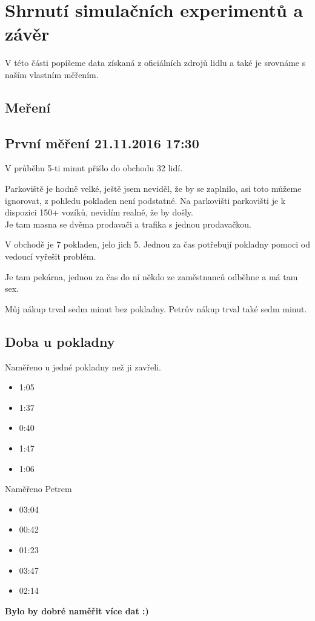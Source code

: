 \documentclass[12pt,a4paper,titlepage]{article}
\begin{document}
\section{Shrnutí simulačních experimentů a závěr}

V této části popíšeme data získaná z oficiálních zdrojů lidlu a také je srovnáme s naším vlastním měřením.
\subsection{Meření}
\subsection{První měření 21.11.2016 17:30}
V průběhu 5-ti minut přišlo do obchodu 32 lidí.

Parkoviště je hodně velké, ještě jsem neviděl, že by se zaplnilo, asi toto můžeme ignorovat, z pohledu pokladen není podstatné.
Na parkovišti parkovišti je k dispozici 150+ vozíků, nevidím realně, že by došly.
\\
Je tam masna se dvěma prodavači a trafika s jednou prodavačkou.

V obchodě je 7 pokladen, jelo jich 5. Jednou za čas potřebují pokladny pomoci od vedoucí vyřešit problém.

Je tam pekárna, jednou za čas do ní někdo ze zaměstnanců odběhne a má tam sex.

Můj nákup trval sedm minut bez pokladny. Petrův nákup trval také sedm minut.

\subsection{Doba u pokladny}
Naměřeno u jedné pokladny než ji zavřeli.
\begin{itemize}
\item 1:05
\item 1:37
\item 0:40
\item 1:47
\item 1:06
\end{itemize}
Naměřeno Petrem
\begin{itemize}
\item 03:04
\item 00:42
\item 01:23
\item 03:47
\item 02:14
\end{itemize}


\textbf{Bylo by dobré naměřit více dat :) }
\end{document}
